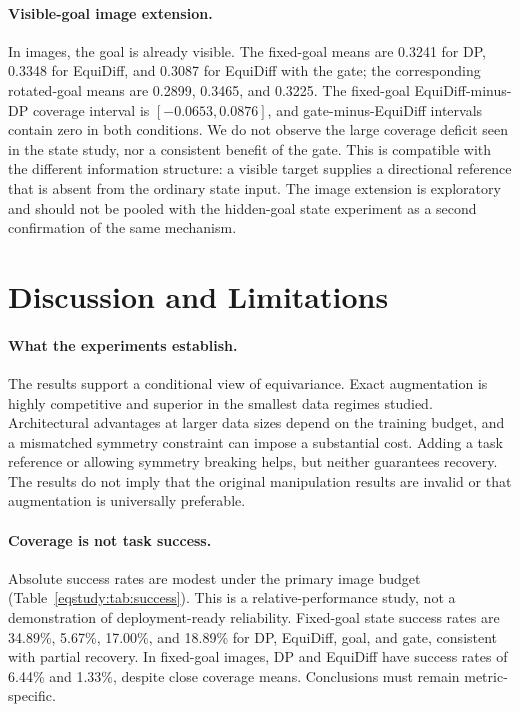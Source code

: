 \paragraph{Visible-goal image extension.}
In images, the goal is already visible. The fixed-goal means are 0.3241
for DP, 0.3348 for EquiDiff, and 0.3087 for EquiDiff with the gate; the
corresponding rotated-goal means are 0.2899, 0.3465, and 0.3225.
The fixed-goal EquiDiff-minus-DP coverage interval is
$[-0.0653,0.0876]$, and gate-minus-EquiDiff intervals contain zero in
both conditions. We do not observe the large coverage deficit seen in
the state study, nor a consistent benefit of the gate. This is compatible
with the different information structure: a visible target supplies a
directional reference that is absent from the ordinary state input.
The image extension is exploratory and should not be pooled with the
hidden-goal state experiment as a second confirmation of the same mechanism.

\section{Discussion and Limitations}
\label{eqstudy:sec:discussion}
\paragraph{What the experiments establish.}
The results support a conditional view of equivariance. Exact augmentation
is highly competitive and superior in the smallest data regimes studied.
Architectural advantages at larger data sizes depend on the training budget,
and a mismatched symmetry constraint can impose a substantial cost. Adding
a task reference or allowing symmetry breaking helps, but neither guarantees
recovery. The results do not imply that the original manipulation results
are invalid or that augmentation is universally preferable.

\paragraph{Coverage is not task success.}
Absolute success rates are modest under the primary image budget
(Table~\ref{eqstudy:tab:success}). This is a relative-performance study, not
a demonstration of deployment-ready reliability. Fixed-goal state success
rates are 34.89\%, 5.67\%, 17.00\%, and 18.89\% for DP, EquiDiff,
goal, and gate, consistent with partial recovery. In fixed-goal images,
DP and EquiDiff have success rates of 6.44\% and 1.33\%, despite close
coverage means. Conclusions must remain metric-specific.


